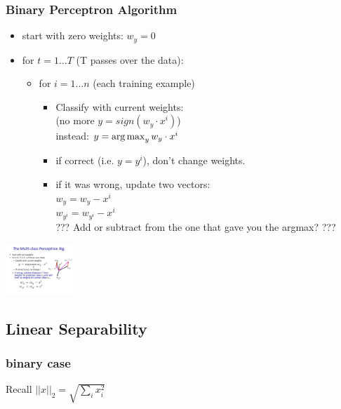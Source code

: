  \subsubsection{Binary Perceptron Algorithm}
 \begin{itemize}
 	\item start with zero weights: $w_y=0$
	\item for $ t = 1 \dots T$ (T passes over the data):
		\begin{itemize}
			\item for $i = 1 \dots n$ (each training example)
			\begin{itemize}
				\item  Classify with current weights: \hfill \\
					(no more $ y = sign(w_y \cdot x^i)$) \hfill \\
					instead:  $y= \operatorname*{arg\,max}_y w_y \cdot x^i$ \hfill \\
				\item if correct (i.e. $y = y^i$), don't change weights.
				\item if it was wrong, update two vectors: \hfill \\
					$w_y = w_y -x^i$ \hfill \\
					$w_{y^i} = w_{y^i} -x^i$ \hfill \\
					??? Add or subtract from the one that gave you the argmax? ???
			\end{itemize}
		\end{itemize}
 \end{itemize}
 \includegraphics[width=1.0in]{figures/multi_perceptron_rule.pdf}
 
 \subsection{Linear Separability}
 \subsubsection{binary case}
Recall $ \displaystyle  ||x||_2 = \sqrt{\sum_i x_i^2}$ 
 
